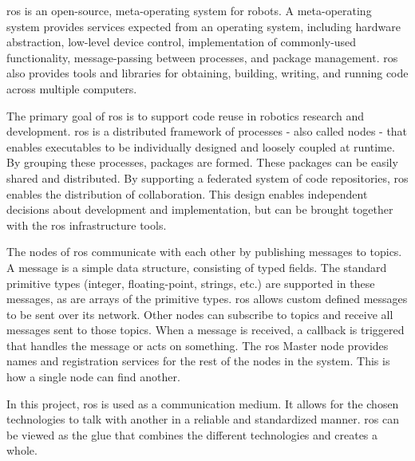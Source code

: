 \ac{ros} is an open\hyp{}source, meta\hyp{}operating system for robots. A meta\hyp{}operating system provides services expected from an operating system, including hardware abstraction, low\hyp{}level device control, implementation of commonly\hyp{}used functionality, message\hyp{}passing between processes, and package management. \acs{ros} also provides tools and libraries for obtaining, building, writing, and running code across multiple computers. \cite{ros_introduction}

The primary goal of \acs{ros} is to support code reuse in robotics research and development. \acs{ros} is a distributed framework of processes - also called nodes - that enables executables to be individually designed and loosely coupled at runtime. By grouping these processes, packages are formed. These packages can be easily shared and distributed. By supporting a federated system of code repositories, \acs{ros} enables the distribution of collaboration. This design enables independent decisions about development and implementation, but can be brought together with the \acs{ros} infrastructure tools. \cite{newman2017systematic}

The nodes of \acs{ros} communicate with each other by publishing messages to topics. A message is a simple data structure, consisting of typed fields. The standard primitive types (integer, floating\hyp{}point, strings, etc.) are supported in these messages, as are arrays of the primitive types. \acs{ros} allows custom defined messages to be sent over its network. Other nodes can subscribe to topics and receive all messages sent to those topics. When a message is received, a callback is triggered that handles the message or acts on something. The \acs{ros} Master node provides names and registration services for the rest of the nodes in the system. This is how a single node can find another. \cite{ros_messages}

In this project, \acs{ros} is used as a communication medium. It allows for the chosen technologies to talk with another in a reliable and standardized manner. \acs{ros} can be viewed as the glue that combines the different technologies and creates a whole.